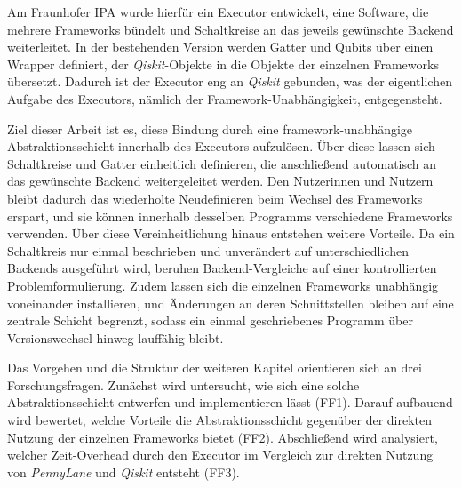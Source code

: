 Am Fraunhofer IPA wurde hierfür ein Executor entwickelt, eine Software, die mehrere Frameworks bündelt und Schaltkreise an das jeweils gewünschte Backend weiterleitet. In der bestehenden Version werden Gatter und Qubits über einen Wrapper definiert, der \textit{Qiskit}-Objekte in die Objekte der einzelnen Frameworks übersetzt. Dadurch ist der Executor eng an \textit{Qiskit} gebunden, was der eigentlichen Aufgabe des Executors, nämlich der Framework-Unabhängigkeit, entgegensteht.

Ziel dieser Arbeit ist es, diese Bindung durch eine framework-unabhängige Abstraktionsschicht innerhalb des Executors aufzulösen. Über diese lassen sich Schaltkreise und Gatter einheitlich definieren, die anschließend automatisch an das gewünschte Backend weitergeleitet werden. Den Nutzerinnen und Nutzern bleibt dadurch das wiederholte Neudefinieren beim Wechsel des Frameworks erspart, und sie können innerhalb desselben Programms verschiedene Frameworks verwenden. Über diese Vereinheitlichung hinaus entstehen weitere Vorteile. Da ein Schaltkreis nur einmal beschrieben und unverändert auf unterschiedlichen Backends ausgeführt wird, beruhen Backend-Vergleiche auf einer kontrollierten Problemformulierung. Zudem lassen sich die einzelnen Frameworks unabhängig voneinander installieren, und Änderungen an deren Schnittstellen bleiben auf eine zentrale Schicht begrenzt, sodass ein einmal geschriebenes Programm über Versionswechsel hinweg lauffähig bleibt.

Das Vorgehen und die Struktur der weiteren Kapitel orientieren sich an drei Forschungsfragen. Zunächst wird untersucht, wie sich eine solche Abstraktionsschicht entwerfen und implementieren lässt (FF1). Darauf aufbauend wird bewertet, welche Vorteile die Abstraktionsschicht gegenüber der direkten Nutzung der einzelnen Frameworks bietet (FF2). Abschließend wird analysiert, welcher Zeit-Overhead durch den Executor im Vergleich zur direkten Nutzung von \textit{PennyLane} und \textit{Qiskit} entsteht (FF3).